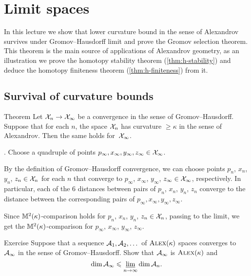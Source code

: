 
\chapter{Limit spaces}\label{chap:lim}\label{chap:stability}

In this lecture we show that lower curvature bound in the sense of Alexandrov survives under Gromov--Hausdorff limit and prove the Gromov selection theorem.
This theorem is the main source of applications of Alexandrov geometry,
as an illustration we prove the homotopy stability theorem (\ref{thm:h-stability}) and deduce the homotopy finiteness theorem (\ref{thm:h-finiteness}) from it.


\section{Survival of curvature bounds}

\begin{thm}{Theorem}\label{thm:CBB-closed}
Let $\mathcal{X}_n\to \mathcal{X}_\infty$ be a convergence in the sense of Gromov--Hausdorff.
Suppose that for each $n$, the space $\mathcal{X}_n$ has curvature $\ge\kappa$ in the sense of Alexandrov.
Then the same holds for~$\mathcal{X}_\infty$.
\end{thm}

.
Choose a quadruple of points $p_\infty, x_\infty,y_\infty,z_\infty\in \mathcal{X}_\infty$.

By the definition of Gromov--Hausdorff convergence, we can choose points $p_n$,  $x_n$, $y_n$, $z_n\in \mathcal{X}_n$ for each $n$
that converge to $p_\infty$, $x_\infty$, $y_\infty$, $z_\infty\in \mathcal{X}_\infty$, respectively.
In particular, each of the 6 distances between pairs of $p_n$, $x_n$, $y_n$, $z_n$ converge to the distance between the corresponding pairs of $p_\infty, x_\infty,y_\infty,z_\infty$.

Since $\mathbb{M}^2(\kappa)$-comparison holds for $p_n$, $x_n$, $y_n$, $z_n\in \mathcal{X}_n$,
passing to the limit, we get the $\mathbb{M}^2(\kappa)$-comparison for $p_\infty$,  $x_\infty$, $y_\infty$, $z_\infty$.
\qeds

\begin{thm}{Exercise}\label{ex:dim-lim}
Suppose that a sequence $\mathcal{A}_1,\mathcal{A}_2,\dots$ of $\textsc{Alex}(\kappa)$ spaces converges to $\mathcal{A}_\infty$ in the sense of Gromov--Hausdorff.
Show that $\mathcal{A}_\infty$ is $\textsc{Alex}(\kappa)$ and
\[\operatorname{\rm dim}\nolimits \mathcal{A}_\infty\leqslant \varliminf_{n\to\infty} \operatorname{\rm dim}\nolimits \mathcal{A}_n.\]
\end{thm}

